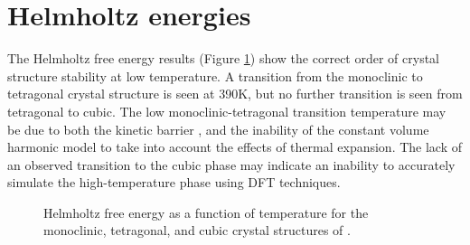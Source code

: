 \section{Helmholtz energies}



The Helmholtz free energy results (Figure \ref{Figure:helmholtz}) show the correct order of crystal structure stability at low temperature. A transition from the monoclinic to tetragonal crystal structure is seen at 390K, but no further transition is seen from tetragonal to cubic. The low monoclinic-tetragonal transition temperature may be due to both the kinetic barrier \cite{bansal1972martensitic,bansal1974martensitic}, and the inability of the constant volume harmonic model to take into account the effects of thermal expansion. The lack of an observed transition to the cubic phase may indicate an inability to accurately simulate the high-temperature phase using DFT techniques. 


\begin{figure}[ht] %
\begin{center}
		\caption{Helmholtz free energy as a function of temperature for the monoclinic, tetragonal, and cubic crystal structures of \zirconia .}
		\label{Figure:helmholtz}
	\end{center}
\end{figure}

